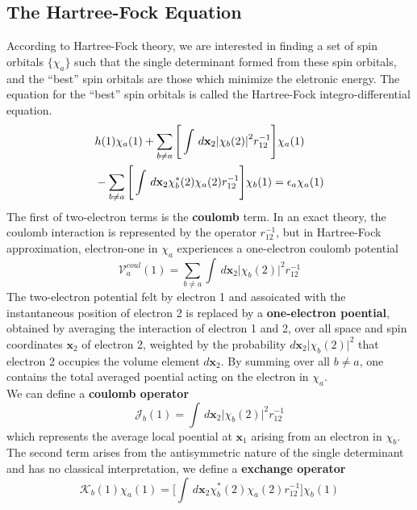 \documentclass[11pt]{article}
\begin{document}
\subsection{The Hartree-Fock Equation}
According to Hartree-Fock theory, we are interested in finding a set of spin orbitals $\{\chi_a\}$ such that the single determinant formed from these spin orbitals,
and the ``best'' spin orbitals are those which minimize the eletronic energy. The equation for the ``best'' spin orbitals is called the Hartree-Fock integro-differential
equation.
\begin{align}
    &h(1)\chi_a(1)+\sum_{b\neq a}\Bigg[\int\,d\mathbf{x}_2 {\lvert \chi_b(2) \rvert}^2 r_{12}^{-1}\Bigg]\chi_a(1) \notag \\
    &-\sum_{b\neq a}\Bigg[\int\,d\mathbf{x}_2 \chi_b^*(2)\chi_a(2) r_{12}^{-1}\Bigg]\chi_b(1)=\epsilon_a\chi_a(1)
\end{align}
The first of two-electron terms is the \textbf{coulomb} term. In an exact theory, the coulomb interaction is represented by the operator $r_{12}^{-1}$, but in Hartree-Fock 
approximation, electron-one in $\chi_a$ experiences a one-electron coulomb potential
\begin{equation}
    \mathcal{V}_a^{coul}(1)=\sum_{b\neq a}\int\,d\mathbf{x}_2 {\lvert \chi_b(2) \rvert}^2 r_{12}^{-1}
\end{equation}
The two-electron potential felt by electron 1 and assoicated with the instantaneous position of electron 2 is replaced by a \textbf{one-electron poential}, obtained by averaging
the interaction of electron 1 and 2, over all space and spin coordinates $\mathbf{x}_2$ of electron 2, weighted by the probability $d\mathbf{x}_2 {\lvert \chi_b(2) \rvert}^2$ that
electron 2 occupies the volume element $d\mathbf{x}_2$. By summing over all $b \neq a$, one contains the total averaged poential acting on the electron in $\chi_a$.\\
We can define a \textbf{coulomb operator}
\begin{equation}
    \mathcal{J}_b(1)=\int\,d\mathbf{x}_2 {\lvert \chi_b(2) \rvert}^2 r_{12}^{-1}
\end{equation}
which represents the average local poential at $\mathbf{x}_1$ arising from an electron in $\chi_b$.
The second term arises from the antisymmetric nature of the single determinant and has no classical interpretation, we define a \textbf{exchange operator}
\begin{equation}
    \mathcal{K}_b(1)\chi_a(1)=\bigg[\int\,d\mathbf{x}_2 \chi_b^*(2)\chi_a(2) r_{12}^{-1}\bigg]\chi_b(1)
\end{equation}
\end{document}

